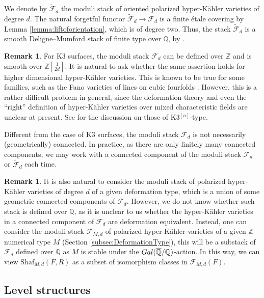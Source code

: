 \documentclass[11pt,reqno,oneside]{amsart}
\numberwithin{equation}{section}
\theoremstyle{definition}
\newtheorem{remark}[theorem]{Remark}
\newcommand{\Gal}{{\rm Gal}}
\newcommand{\Sha}{\mathrm{Shaf}}
\newcommand{\scF}{\mathscr{F}}
\newcommand{\QQ}{\mathbb{Q}}
\newcommand{\ZZ}{\mathbb{Z}}
\begin{document}
We denote by $\widetilde{\scF}_d$ the moduli stack of oriented polarized hyper-Kähler varieties of degree $d$.  The natural forgetful functor $\widetilde{\scF}_d \to \scF_d$ is a finite \'etale covering by Lemma \ref{lemma:liftoforientation}, which is of degree two. Thus, the stack $\widetilde{\scF}_d$ is a smooth Deligne--Mumford stack of finite type over $\QQ$, by . 






\begin{remark}
For K3 surfaces, the moduli stack $\scF_d$ can be defined over $\ZZ$ and is smooth over $\ZZ[\frac{1}{2d}]$.  It is natural to ask whether the same assertion holds for higher dimensional hyper-Kähler varieties. This is known to be true for some families, such as the Fano varieties of lines on cubic fourfolds  \cite{A96}. However, this is a rather difficult problem in general, since the deformation theory and even the ``right'' definition of hyper-Kähler varieties over mixed characteristic fields are unclear at present. See \cite{Yang2019} for the discussion on those of K3$^{[n]}$-type.
\end{remark} 

Different from the case of K3 surfaces, the moduli stack  $\scF_{d}$ is not necessarily (geometrically)  connected.
In practice, as there are only finitely many connected components, we may work with a connected component of the moduli stack $\scF_{d}$ or $\widetilde{\scF}_d$ each time.




\begin{remark}
It is also natural to consider the moduli stack of polarized hyper-Kähler varieties of degree $d$ of a given deformation type, which is a union of some geometric connected components of $\scF_d$. However, we do not know whether such stack is defined over $\QQ$, as it is unclear to us whether the hyper-Kähler varieties in a connected component of $\scF_{d}$ are deformation equivalent. Instead, one can consider the moduli stack $\scF_{M,d}$ of polarized hyper-Kähler varieties of a given $\widehat{\ZZ}$ numerical type $M$ (Section \ref{subsec:DeformationType}), this will be a substack of $\scF_d$ defined over $\QQ$ as $M$ is stable under the $\Gal(\overline{\QQ}/\QQ)$-action. In this way, we can view $\Sha_{M,d}(F,R)$ as a subset of isomorphism classes in $\scF_{M,d}(F)$. 
\end{remark}

\subsection{Level structures}\label{subsection:levelstructure}
\end{document}
